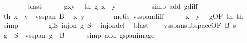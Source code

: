 \begin{isabellebody}
\ \ \ \ \ \ \isamarkupfalse%
\ blast{\isacharplus}{\kern0pt}\isanewline
\ \ \ \ \isamarkupfalse%
\ gxy\ \isamarkupfalse%
\ th{}{\isacharcolon}{\kern0pt}\ {\isachardoublequoteopen}g\ {\isacharparenleft}{\kern0pt}x\ {\isacharminus}{\kern0pt}\ y{\isacharparenright}{\kern0pt}\ {\isacharequal}{\kern0pt}\ {}{\isachardoublequoteclose}\isanewline
\ \ \ \ \ \ \isamarkupfalse%
\ {\isacharparenleft}{\kern0pt}simp\ add{\isacharcolon}{\kern0pt}\ g{\isachardot}{\kern0pt}diff{\isacharparenright}{\kern0pt}\isanewline
\ \ \ \ \isamarkupfalse%
\ th{}{\isacharcolon}{\kern0pt}\ {\isachardoublequoteopen}x\ {\isacharminus}{\kern0pt}\ y\ {\isasymin}\ vs{}{\isachardot}{\kern0pt}span\ B{\isachardoublequoteclose}\ \isamarkupfalse%
\ x{\isacharprime}{\kern0pt}\ y{\isacharprime}{\kern0pt}\isanewline
\ \ \ \ \ \ \isamarkupfalse%
\ {\isacharparenleft}{\kern0pt}metis\ vs{}{\isachardot}{\kern0pt}span{\isacharunderscore}{\kern0pt}diff{\isacharparenright}{\kern0pt}\isanewline
\ \ \ \ \isamarkupfalse%
\ {\isachardoublequoteopen}x\ {\isacharequal}{\kern0pt}\ y{\isachardoublequoteclose}\ \isamarkupfalse%
\ g{}{\isacharbrackleft}{\kern0pt}OF\ th{}\ th{}{\isacharbrackright}{\kern0pt}\ \isamarkupfalse%
\ simp\isanewline
\ \ \isacommand{{\isacharbraceright}{\kern0pt}}\isamarkupfalse%
\isanewline
\ \ \isamarkupfalse%
\ \isamarkupfalse%
\ giS{\isacharcolon}{\kern0pt}\ {\isachardoublequoteopen}inj{\isacharunderscore}{\kern0pt}on\ g\ S{\isachardoublequoteclose}\ \isamarkupfalse%
\ inj{\isacharunderscore}{\kern0pt}on{\isacharunderscore}{\kern0pt}def\ \isamarkupfalse%
\ blast\isanewline
\ \ \isamarkupfalse%
\ vs{}{\isachardot}{\kern0pt}span{\isacharunderscore}{\kern0pt}subspace{\isacharbrackleft}{\kern0pt}OF\ B{\isacharparenleft}{\kern0pt}{}{\isacharcomma}{\kern0pt}{}{\isacharparenright}{\kern0pt}\ s{\isacharbrackright}{\kern0pt}\isanewline
\ \ \isamarkupfalse%
\ {\isachardoublequoteopen}g\ {\isacharbackquote}{\kern0pt}\ S\ {\isacharequal}{\kern0pt}\ vs{}{\isachardot}{\kern0pt}span\ {\isacharparenleft}{\kern0pt}g\ {\isacharbackquote}{\kern0pt}\ B{\isacharparenright}{\kern0pt}{\isachardoublequoteclose}\isanewline
\ \ \ \ \isamarkupfalse%
\ {\isacharparenleft}{\kern0pt}simp\ add{\isacharcolon}{\kern0pt}\ g{\isachardot}{\kern0pt}span{\isacharunderscore}{\kern0pt}image{\isacharparenright}{\kern0pt}\isanewline

\end{isabellebody}
